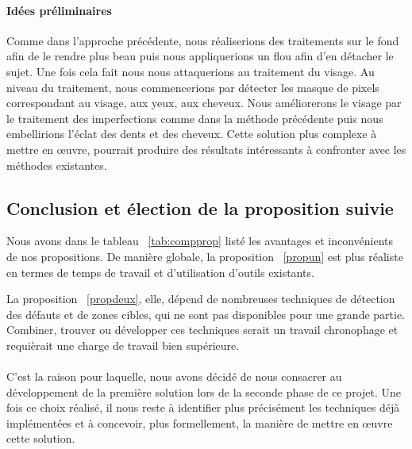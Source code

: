 \documentclass[11pt, french]{report-rd-info}
\begin{document}
\paragraph{Idées préliminaires}
Comme dans l’approche précédente, nous réaliserions des traitements sur le fond afin de le rendre plus beau puis nous appliquerions un flou afin d’en détacher le sujet. Une fois cela fait nous nous attaquerions au traitement du visage. Au niveau du traitement, nous commencerions par détecter les masque de pixels correspondant au visage, aux yeux, aux cheveux. Nous améliorerons le visage par le traitement des imperfections comme dans la méthode précédente puis nous embellirions l’éclat des dents et des cheveux.
Cette solution plus complexe à mettre en œuvre, pourrait produire des résultats intéressants à confronter avec les méthodes existantes.
\subsection{Conclusion et élection de la proposition suivie}
Nous avons dans le tableau ~\ref{tab:compprop} listé les avantages et inconvénients de nos propositions. De manière globale, la proposition ~\ref{propun} est plus réaliste en termes de temps de travail et d’utilisation d’outils existants. 

La proposition ~\ref{propdeux}, elle, dépend de nombreuses techniques de détection des défauts et de zones cibles, qui ne sont pas disponibles pour une grande partie. Combiner, trouver ou développer ces techniques serait un travail chronophage et requièrait une charge de travail bien supérieure. 
\paragraph*{}
C’est la raison pour laquelle, nous avons décidé de nous consacrer au développement de la première solution lors de la seconde phase de ce projet. Une fois ce choix réalisé, il nous reste à identifier plus précisément les techniques déjà implémentées
et à concevoir, plus formellement, la manière de mettre en œuvre cette solution.
\end{document}
